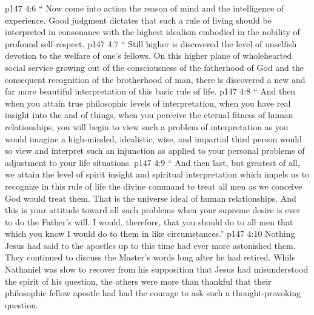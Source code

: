 \pc \vs p147 4:6 \textcolor{ubdarkred}{“\bibnobreakspace {} Now come into action the reason of mind and the intelligence of experience. Good judgment dictates that such a rule of living should be interpreted in consonance with the highest idealism embodied in the nobility of profound self\hyp{}respect.}
\pc \vs p147 4:7 \textcolor{ubdarkred}{“\bibnobreakspace {} Still higher is discovered the level of unselfish devotion to the welfare of one’s fellows. On this higher plane of wholehearted social service growing out of the consciousness of the fatherhood of God and the consequent recognition of the brotherhood of man, there is discovered a new and far more beautiful interpretation of this basic rule of life.}
\pc \vs p147 4:8 \textcolor{ubdarkred}{“\bibnobreakspace {} And then when you attain true philosophic levels of interpretation, when you have real insight into the  and  of things, when you perceive the eternal fitness of human relationships, you will begin to view such a problem of interpretation as you would imagine a high\hyp{}minded, idealistic, wise, and impartial third person would so view and interpret such an injunction as applied to your personal problems of adjustment to your life situations.}
\pc \vs p147 4:9 \textcolor{ubdarkred}{“\bibnobreakspace {} And then last, but greatest of all, we attain the level of spirit insight and spiritual interpretation which impels us to recognize in this rule of life the divine command to treat all men as we conceive God would treat them. That is the universe ideal of human relationships. And this is your attitude toward all such problems when your supreme desire is ever to do the Father’s will. I would, therefore, that you should do to all men that which you know I would do to them in like circumstances.”}
\pc \vs p147 4:10 Nothing Jesus had said to the apostles up to this time had ever more astonished them. They continued to discuss the Master’s words long after he had retired. While Nathaniel was slow to recover from his supposition that Jesus had misunderstood the spirit of his question, the others were more than thankful that their philosophic fellow apostle had had the courage to ask such a thought\hyp{}provoking question.
%
